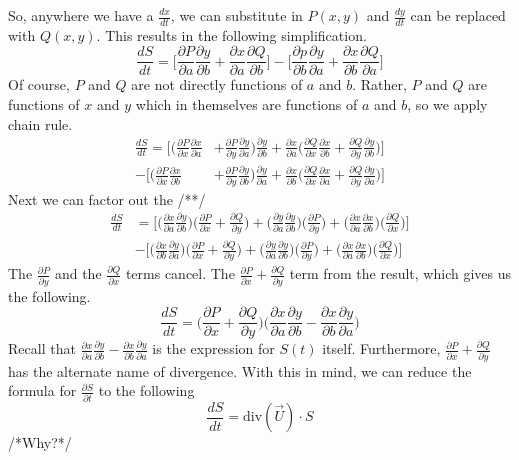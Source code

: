 \documentclass[a4paper]{article}
\newcommand{\pder}[2]{\frac{\partial#1}{\partial#2}}
\newcommand{\der}[2]{\frac{d#1}{d#2}}
\begin{document}
So, anywhere we have a $\der{x}{t}$, we can substitute in $P(x,y)$ and $\der{y}{t}$ can be replaced with $Q(x,y)$. This results in the following simplification.
\begin{equation*}
\der{S}{t}  = \Big[\pder{P}{a}\pder{y}{b}
		    +\pder{x}{a}\pder{Q}{b}\Big]
	    	-\Big[\pder{p}{b}\pder{y}{a}
        	+ \pder{x}{b}\pder{Q}{a}\Big]
\end{equation*}
Of course, $P$ and $Q$ are not directly functions of $a$ and $b$. Rather, $P$ and $Q$ are functions of $x$ and $y$ which in themselves are functions of $a$ and $b$, so we apply chain rule.
\begin{align*}
\der{S}{t}  
= \Big[\Big(\pder{P}{x}\pder{x}{a}&+\pder{P}{y}\pder{y}{a}\Big)\pder{y}{b}
+\pder{x}{a}\Big(\pder{Q}{x}\pder{x}{b}+\pder{Q}{y}\pder{y}{b}\Big)\Big]\\
-\Big[\Big(\pder{P}{x}\pder{x}{b}&+\pder{P}{y}\pder{y}{b}\Big)\pder{y}{a}
+ \pder{x}{b}\Big(\pder{Q}{x}\pder{x}{a}+\pder{Q}{y}\pder{y}{a}\Big)\Big]
\end{align*}
Next we can factor out the /**/
\begin{align*}
\der{S}{t}
&=\Big[\Big(\pder{x}{a}\pder{y}{b}\Big)\Big(\pder{P}{x}+\pder{Q}{y}\Big)
+\Big(\pder{y}{a}\pder{y}{b}\Big)\Big(\pder{P}{y}\Big)
+\Big(\pder{x}{a}\pder{x}{b}\Big)\Big(\pder{Q}{x}\Big)\Big]\\
&-\Big[\Big(\pder{x}{b}\pder{y}{a}\Big)\Big(\pder{P}{x}+\pder{Q}{y}\Big)
+\Big(\pder{y}{a}\pder{y}{b}\Big)\Big(\pder{P}{y}\Big)
+\Big(\pder{x}{a}\pder{x}{b}\Big)\Big(\pder{Q}{x}\Big)\Big]
\end{align*}
The $\pder{P}{y}$ and the $\pder{Q}{x}$ terms cancel. The $\pder{P}{x}+\pder{Q}{y}$ term from the result, which gives us the following.
\begin{equation*}
\der{S}{t} = \Big(\pder{P}{x}+\pder{Q}{y}\Big)\Big(\pder{x}{a}\pder{y}{b}-\pder{x}{b}\pder{y}{a}\Big)
\end{equation*}
Recall that $\pder{x}{a}\pder{y}{b} - \pder{x}{b}\pder{y}{a}$ is the expression for $S(t)$ itself. Furthermore, $\pder{P}{x}+\pder{Q}{y}$ has the alternate name of divergence. With this in mind, we can reduce the formula for $\pder{S}{t}$ to the following 
\begin{equation}
\der{S}{t} = \text{div}({\vec{U}})\cdot S \label{div}
\end{equation}
/*Why?*/
\end{document}
